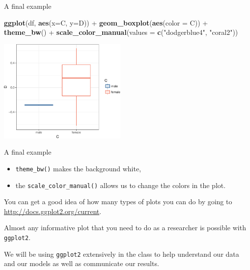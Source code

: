 \documentclass[10pt,ignorenonframetext,]{beamer}
\newenvironment{Shaded}{\begin{snugshade}}{\end{snugshade}}
\newcommand{\KeywordTok}[1]{\textcolor[rgb]{0.13,0.29,0.53}{\textbf{{#1}}}}
\newcommand{\DataTypeTok}[1]{\textcolor[rgb]{0.13,0.29,0.53}{{#1}}}
\newcommand{\StringTok}[1]{\textcolor[rgb]{0.31,0.60,0.02}{{#1}}}
\newcommand{\NormalTok}[1]{{#1}}
\providecommand{\tightlist}{%
\setlength{\itemsep}{0pt}\setlength{\parskip}{0pt}}
\begin{document}

\begin{frame}[fragile]{A final example}

\begin{Shaded}
\begin{Highlighting}[]
\KeywordTok{ggplot}\NormalTok{(df, }\KeywordTok{aes}\NormalTok{(}\DataTypeTok{x=}\NormalTok{C, }\DataTypeTok{y=}\NormalTok{D)) +}
\StringTok{  }\KeywordTok{geom_boxplot}\NormalTok{(}\KeywordTok{aes}\NormalTok{(}\DataTypeTok{color =} \NormalTok{C)) +}
\StringTok{  }\KeywordTok{theme_bw}\NormalTok{() +}
\StringTok{  }\KeywordTok{scale_color_manual}\NormalTok{(}\DataTypeTok{values =} \KeywordTok{c}\NormalTok{(}\StringTok{"dodgerblue4"}\NormalTok{, }\StringTok{"coral2"}\NormalTok{))}
\end{Highlighting}
\end{Shaded}

\centerline{\includegraphics[height=2in]{03_UnderstandData_files/figure-beamer/unnamed-chunk-14-1.pdf}}

\end{frame}

\begin{frame}[fragile]{A final example}

\begin{itemize}
\tightlist
\item
  \texttt{theme\_bw()} makes the background white,
\item
  the \texttt{scale\_color\_manual()} allows us to change the colors in
  the plot.
\end{itemize}

You can get a good idea of how many types of plots you can do by going
to
\href{http://docs.ggplot2.org/current/}{http://docs.ggplot2.org/current}.

Almost any informative plot that you need to do as a researcher is
possible with \texttt{ggplot2}.

We will be using \texttt{ggplot2} extensively in the class to help
understand our data and our models as well as communicate our results.

\end{frame}
\end{document}
